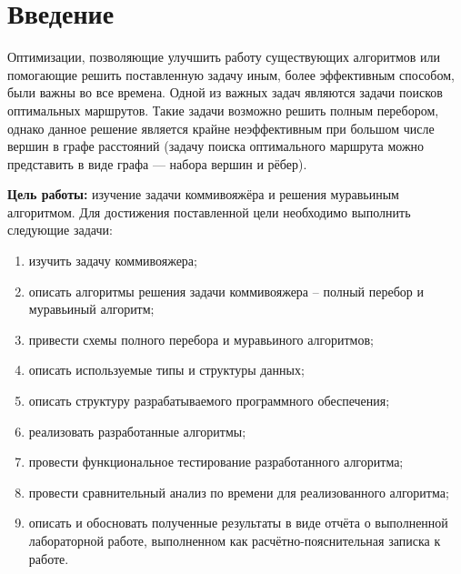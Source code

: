 \chapter*{Введение}

Оптимизации, позволяющие улучшить работу существующих алгоритмов или помогающие решить поставленную задачу иным, более эффективным способом, были важны во все времена.
Одной из важных задач являются задачи поисков оптимальных маршрутов.
Такие задачи возможно решить полным перебором, однако данное решение является крайне неэффективным при большом числе вершин в графе расстояний (задачу поиска оптимального маршрута можно представить в виде графа --- набора вершин и рёбер).

\textbf{Цель работы:} изучение задачи коммивояжёра и решения муравьиным алгоритмом. 
Для достижения поставленной цели необходимо выполнить следующие задачи:
\begin{enumerate}[label=\arabic*)]
	\item изучить задачу коммивояжера;
	\item описать алгоритмы решения задачи коммивояжера -- полный перебор и муравьиный алгоритм;
	\item привести схемы полного перебора и муравьиного алгоритмов;
	\item описать используемые типы и структуры данных;
	\item описать структуру разрабатываемого программного обеспечения;
	\item реализовать разработанные алгоритмы;
	\item провести функциональное тестирование разработанного алгоритма;
	\item провести сравнительный анализ по времени для реализованного алгоритма;
	\item описать и обосновать полученные результаты в виде отчёта о выполненной лабораторной работе, выполненном как расчётно-пояснительная записка к работе.
\end{enumerate}
